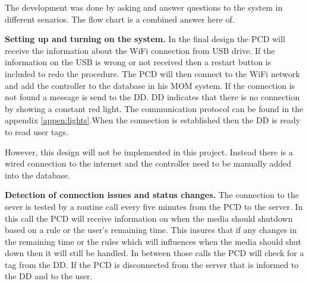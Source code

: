 
The development was done by asking and answer questions to the system in different senarios.\newline
The flow chart is a combined answer here of. \newline

\textbf{Setting up and turning on the system.} \newline
In the final design the PCD will receive the information about the WiFi connection from USB drive.
If the information on the USB is wrong or not received then a restart button is included to redo the procedure.  \newline
The PCD will then connect to the WiFi network and add the controller to the database in his MOM system. If the connection is not found a message is send to the DD. \newline 
DD indicates that there is no connection by showing a constant red light. The communication protocol can be found in the appendix \vref{appen:lights}.\newline When the connection is established then the DD is ready to read user tags.\newline

However, this design will not be implemented in this project. Instead there is a wired connection to the internet and the controller need to be manually added into the database.

\textbf{Detection of connection issues and status changes.} \newline
The connection to the sever is tested by a routine call every five minutes from the PCD to the server. In this call the PCD will receive information on when the media should shutdown based on a rule or the user's remaining time. This insures that if any changes in the remaining time or the rules which will influences when the media should shut down then it will still be handled.
In between those calls the PCD will check for a tag from the DD. If the PCD is disconnected from the server that is informed to the DD and to the user.  \newline
	

